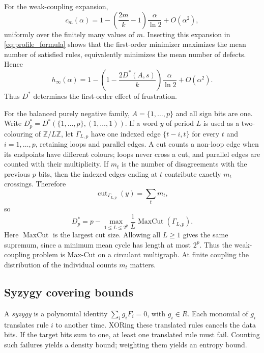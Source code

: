 \documentclass[11pt,a4paper]{article}
\begin{document}
For the weak-coupling expansion,
\[
    c_m(\alpha)
    =1-\left(\frac{2m}{k}-1\right)\frac{\alpha}{\ln2}
     +O(\alpha^2),
\]
uniformly over the finitely many values of $m$.  Inserting this
expansion in \eqref{eq:profile_formula} shows that the first-order
minimizer maximizes the mean number of satisfied rules, equivalently
minimizes the mean number of defects.  Hence
\begin{equation}
\label{eq:weak_coupling}
    h_\infty(\alpha)
    =1-\left(1-\frac{2D^*(A,s)}{k}\right)
       \frac{\alpha}{\ln2}+O(\alpha^2).
\end{equation}
Thus $D^*$ determines the first-order effect of frustration.

For the balanced purely negative family, $A=\{1,\ldots,p\}$ and all
sign bits are one.  Write
$D_p^*=D^*(\{1,\ldots,p\},(1,\ldots,1))$.  If a word $y$ of period $L$ is used as a two-colouring of
$\mathbb Z/L\mathbb Z$, let
$\Gamma_{L,p}$ have one indexed edge
$\{t-i,t\}$ for every $t$ and $i=1,\ldots,p$, retaining loops and
parallel edges.  A cut counts a non-loop edge when its endpoints have
different colours; loops never cross a cut, and parallel edges are
counted with their multiplicity.  If $m_t$ is the number of
disagreements with the previous $p$ bits, then the indexed edges ending
at $t$ contribute exactly $m_t$ crossings.  Therefore
\[
    \operatorname{cut}_{\Gamma_{L,p}}(y)=\sum_tm_t,
\]
so
\begin{equation}
\label{eq:maxcut_defect}
    D_p^*=p-\max_{1\le L\le2^p}\frac1L
             \operatorname{MaxCut}(\Gamma_{L,p}).
\end{equation}
Here $\operatorname{MaxCut}$ is the largest cut size.  Allowing
all $L\ge1$ gives the same supremum, since a minimum mean cycle
has length at most $2^p$.  Thus the weak-coupling problem is Max-Cut
on a circulant multigraph.  At finite coupling the distribution of
the individual counts $m_t$ matters.

\subsection{Syzygy covering bounds}
\label{subsec:syzygy_bounds}

A \emph{syzygy} is a polynomial identity
$\sum_i g_iF_i=0$, with $g_i\in R$.  Each monomial of $g_i$
translates rule $i$ to another time.  XORing these translated rules
cancels the data bits.  If the target bits sum to one, at least one
translated rule must fail.  Counting such failures yields a density
bound; weighting them yields an entropy bound.
\end{document}
